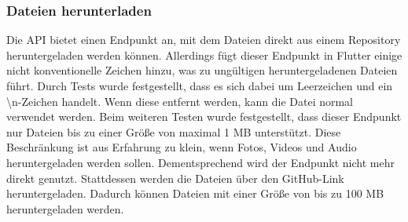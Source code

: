 \subsubsection{Dateien herunterladen}%
Die API bietet einen Endpunkt an, mit dem Dateien direkt aus einem Repository heruntergeladen werden können\cite{imp_github_1mb100mbDownloadFile}. %
	Allerdings fügt dieser Endpunkt in Flutter einige nicht konventionelle Zeichen hinzu, was zu ungültigen heruntergeladenen Dateien führt. Durch Tests wurde festgestellt, dass es sich dabei um Leerzeichen und ein \textbackslash n-Zeichen handelt. Wenn diese entfernt werden, kann die Datei normal verwendet werden.%
\newline%
Beim weiteren Testen wurde festgestellt, dass dieser Endpunkt nur Dateien bis zu einer Größe von maximal 1 MB unterstützt. Diese Beschränkung ist aus Erfahrung zu klein, wenn Fotos, Videos und Audio heruntergeladen werden sollen. %
Dementsprechend wird der Endpunkt nicht mehr direkt genutzt. Stattdessen werden die Dateien über den GitHub-Link heruntergeladen. Dadurch können Dateien mit einer Größe von bis zu 100 MB heruntergeladen werden.%
